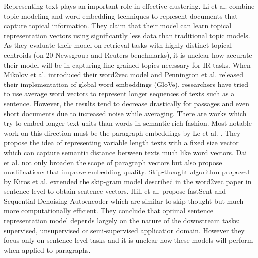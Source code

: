 Representing text plays an important role in effective clustering. Li et al. \cite{li2016generative} combine topic modeling and word embedding techniques to represent documents that capture topical information. They claim that their model can learn topical representation vectors using significantly less data than traditional topic models. As they evaluate their model on retrieval tasks with highly distinct topical centroids (on 20 Newsgroup and Reuters benchmarks), it is unclear how accurate their model will be in capturing fine-grained topics necessary for IR tasks. When Mikolov et al. \cite{mikolov2013distributed} introduced their word2vec model and Pennington et al. \cite{pennington2014glove} released their implementation of global word embeddings (GloVe), researchers have tried to use average word vectors to represent longer sequences of texts such as a sentence. However, the results tend to decrease drastically for passages and even short documents due to increased noise while averaging. There are works which try to embed longer text units than words in semantic-rich fashion. Most notable work on this direction must be the paragraph embeddings by Le et al. \cite{le2014distributed}. They propose the idea of representing variable length texts with a fixed size vector which can capture semantic distance between texts much like word vectors. Dai et al. \cite{dai2015document} not only broaden the scope of paragraph vectors but also propose modifications that improve embedding quality. Skip-thought algorithm proposed by Kiros et al. \cite{kiros2015skip} extended the skip-gram model described in the word2vec paper in sentence-level to obtain sentence vectors. Hill et al. \cite{hill2016learning} propose fastSent and Sequential Denoising Autoencoder which are similar to skip-thought but much more computationally efficient. They conclude that optimal sentence representation model depends largely on the nature of the downstream tasks: supervised, unsupervised or semi-supervised application domain. However they focus only on sentence-level tasks and it is unclear how these models will perform when applied to paragraphs.